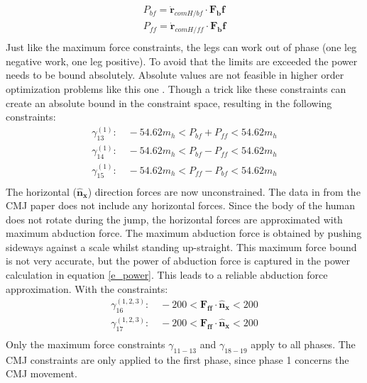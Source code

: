 \begin{equation}\label{e_power}
    \begin{array}{c}
         P_{bf} = \mathbf{\dot r}_{comH/bf} \cdot \mathbf{F_bf}  \\
         P_{ff} = \mathbf{\dot r}_{comH/ff} \cdot \mathbf{F_bf}  \\
    \end{array}
\end{equation}
Just like the maximum force constraints, the legs can work out of phase (one leg negative work, one leg positive). To avoid that the limits are exceeded the power needs to be bound absolutely. Absolute values are not feasible in higher order optimization problems like this one \cite{kelly_introduction_2017}. Though a trick like these constraints can create an absolute bound in the constraint space, resulting in the following constraints:
\begin{equation}
    \begin{array}{c}
         \gamma_{13}^{(1)}:\quad  -54.62 m_h < P_{bf} + P_{ff} < 54.62 m_h  \\
         \gamma_{14}^{(1)}:\quad  -54.62 m_h < P_{bf} - P_{ff} < 54.62 m_h  \\
         \gamma_{15}^{(1)}:\quad  -54.62 m_h < P_{ff} - P_{bf} < 54.62 m_h  \\
    \end{array}
\end{equation}
The horizontal ($\mathbf{\hat n_x}$) direction forces are now unconstrained. The data in from the CMJ paper does not include any horizontal forces. Since the body of the human does not rotate during the jump, the horizontal forces are approximated with maximum abduction force. The maximum abduction force is obtained by pushing sideways against a scale whilst standing up-straight. This maximum force bound is not very accurate, but the power of abduction force is captured in the power calculation in equation \ref{e_power}. This leads to a reliable abduction force approximation. With the constraints:
\begin{equation}
    \begin{array}{c}
         \gamma_{16}^{(1,2,3)}:\quad  -200 < \mathbf{F_{ff}}\cdot \mathbf{\hat n_x} < 200  \\
         \gamma_{17}^{(1,2,3)}: \quad -200 < \mathbf{F_{ff}}\cdot \mathbf{\hat n_x} < 200 \\ 
    \end{array}
\end{equation}
Only the maximum force constraints $\gamma_{11-13}$ and $\gamma_{18-19}$ apply to all phases. The CMJ constraints are only applied to the first phase, since phase 1 concerns the CMJ movement. 

